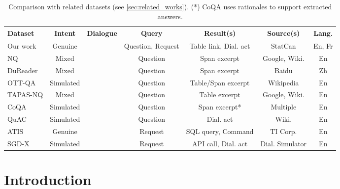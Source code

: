 \documentclass[11pt]{article}
\newcommand{\cmark}{\ding{51}}\newcommand{\xmark}{\ding{55}}\newcommand{\urlx}[1]{\href{#1}{#1}}
\begin{document}
\begin{table*}[t!]
    \small
    \centering
\begin{tabular}{lcccccc}
\toprule
\textbf{Dataset}                          & \textbf{Intent} & \textbf{Dialogue} & \textbf{Query}    & \textbf{Result(s)}     & \textbf{Source(s)} & \textbf{Lang.} \\
\midrule
Our work                                  & Genuine   & \cmark & Question, Request & Table link, Dial. act & StatCan & En, Fr \\
NQ \citeyearpar{kwiatkowski_natural_2019} & Mixed     & \xmark & Question          & Span excerpt           & Google, Wiki.  & En     \\
DuReader \citeyearpar{he_dureader_2018}   & Mixed     & \xmark & Question          & Span excerpt           & Baidu         & Zh     \\
OTT-QA \citeyearpar{chen_open_2020}       & Simulated & \xmark & Question          & Table/Span excerpt     & Wikipedia          & En     \\
TAPAS-NQ \citeyearpar{herzig_open_2021}   & Mixed     & \xmark & Question          & Table excerpt          & Google, Wiki.  & En     \\
CoQA \citeyearpar{reddy_coqa_2019}        & Simulated & \cmark & Question          & Span excerpt*          & Multiple      & En     \\
QuAC \citeyearpar{choi_quac_2018}         & Simulated & \cmark & Question          & Dial. act             & Wiki.          & En     \\
ATIS \citeyearpar{hemphill_atis_1990}     & Genuine   & \cmark & Request           & SQL query, Command     & TI Corp.  & En     \\
SGD-X \citeyearpar{lee2021sgd}            & Simulated & \cmark & Request           & API call, Dial. act   & Dial. Simulator   & En    \\
\bottomrule
\end{tabular}
    \caption{Comparison with related datasets (see \autoref{sec:related_works}). (*) CoQA uses rationales to support extracted answers.\vspace{-3mm}}
    \label{tab:comparison_related_datasets}
\end{table*}


\section{Introduction}
\label{sec:introduction}
\end{document}
